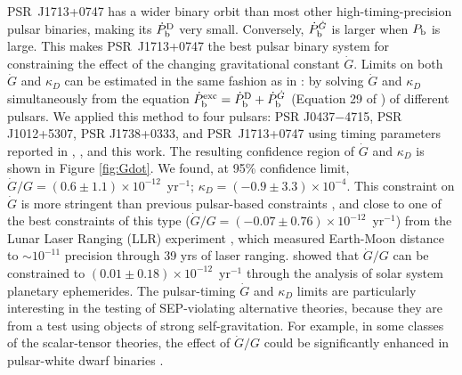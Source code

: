 PSR~J1713+0747 has a wider binary orbit than most other
high-timing-precision pulsar binaries, making its $\dot{P}_{\rm b}^{\rm D}$
very small. Conversely, $\dot{P}_{\rm b}^{\dot{G}}$ is larger when $P_{\rm b}$
is large. This makes PSR~J1713+0747 the best pulsar binary system for constraining
the effect of the changing gravitational constant $\dot{G}$. Limits 
on both $\dot{G}$ and $\kappa_D$ can be estimated in the same fashion as in
\citet{lwj+09}: by solving $\dot{G}$ and $\kappa_D$ simultaneously 
from the equation $\dot{P}_{\rm b}^{\rm exc} = \dot{P}_{\rm b}^{\rm D} +
\dot{P}_{\rm b}^{\dot{G}}$ (Equation 29 of \citealt{lwj+09}) of different
pulsars. We applied this method to four pulsars: PSR J0437$-$4715, PSR J1012+5307, PSR
J1738+0333, and PSR~J1713+0747 using timing parameters reported in
\citet{lwj+09}, \citet{fwe+12}, and this work.
The resulting confidence region of $\dot{G}$ and $\kappa_D$ is shown in Figure
\ref{fig:Gdot}.
We found, at 95\% confidence limit, $\dot{G}/G =
(0.6\pm1.1)\times10^{-12}$~yr$^{-1}$; $\kappa_D=(-0.9\pm3.3)\times10^{-4}$. 
This constraint on $\dot{G}$ is more stringent than
previous pulsar-based constraints \citep{fwe+12},
and close to one of the best constraints of this type
($\dot{G}/G=(-0.07\pm0.76)\times10^{-12}$~yr$^{-1}$) from the Lunar Laser Ranging
(LLR)
experiment \citep{hmb10}, which measured Earth-Moon distance to $\sim10^{-11}$
precision through 39 yrs of laser ranging.
\citet{fle+14} showed that $\dot{G}/G$ can be constrained to 
$(0.01\pm0.18)\times10^{-12}$~yr$^{-1}$ through the analysis of solar system planetary ephemerides.
The pulsar-timing $\dot{G}$ and $\kappa_D$ limits are particularly interesting 
in the testing of SEP-violating alternative theories, because they are from 
a test using objects of strong self-gravitation. For example, in some classes of the 
scalar-tensor theories, the effect of $\dot{G}/G$ could be significantly enhanced 
in pulsar-white dwarf binaries \citep{wex14}.

